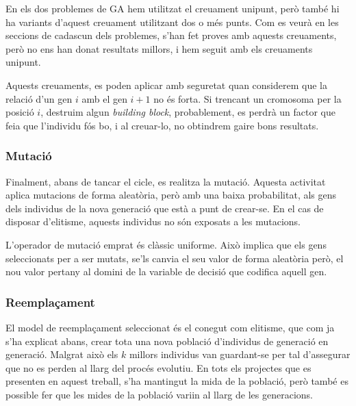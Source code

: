 En els dos problemes de GA hem utilitzat el creuament unipunt, però també hi
ha variants d'aquest creuament utilitzant dos o més punts.  Com es veurà en les
seccions de cadascun dels problemes, s'han fet proves amb aquests creuaments,
però no ens han donat resultats millors, i hem seguit amb els creuaments
unipunt.

Aquests creuaments, es poden aplicar amb seguretat quan considerem que la
relació d'un gen $i$ amb el gen $i+1$ no és forta.  Si trencant un cromosoma per
la posició $i$, destruim algun \emph{building block}, probablement, es perdrà un
factor que feia que l'individu fós bo, i al creuar-lo, no obtindrem gaire bons
resultats.

\subsubsection{Mutació}

Finalment, abans de tancar el cicle, es realitza la mutació. Aquesta activitat
aplica mutacions de forma aleatòria, però amb una baixa probabilitat, als gens
dels individus de la nova generació que està a punt de crear-se. En el cas de
disposar d'elitisme, aquests individus no són exposats a les mutacions.

L'operador de mutació emprat és clàssic uniforme. Això implica que els gens
seleccionats per a ser mutats, se'ls canvia el seu valor de forma aleatòria
però, el nou valor pertany al domini de la variable de decisió que codifica
aquell gen.

\subsubsection{Reemplaçament}

El model de reemplaçament seleccionat és el conegut com elitisme, que com ja
s'ha explicat abans, crear tota una nova població d'individus de generació en
generació. Malgrat això els $k$ millors individus van guardant-se per tal
d'assegurar que no es perden al llarg del procés evolutiu.  En tots els
projectes que es presenten en aquest treball, s'ha mantingut la mida de la
població, però també es possible fer que les mides de la població variin al
llarg de les generacions.



